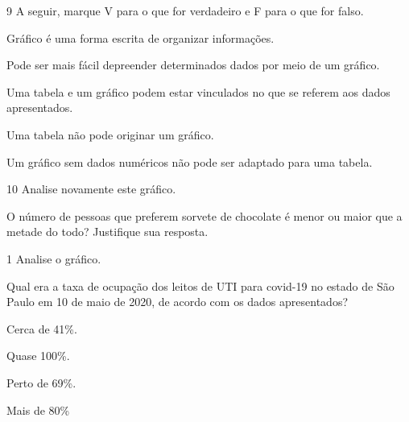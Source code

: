 

\num{9} A seguir, marque V para o que for verdadeiro e F para o que for falso.

\begin{boxlist}
 Gráfico é uma forma escrita de organizar informações.

 Pode ser mais fácil depreender determinados dados por meio de um gráfico.

 Uma tabela e um gráfico podem estar vinculados no que se referem aos dados apresentados.

 Uma tabela não pode originar um gráfico.

 Um gráfico sem dados numéricos não pode ser adaptado para uma tabela.
\end{boxlist}

\num{10} Analise novamente este gráfico.


O número de pessoas que preferem sorvete de chocolate é menor ou maior que a metade do todo? Justifique sua resposta.



\num{1} Analise o gráfico.


Qual era a taxa de ocupação dos leitos de UTI para covid-19 no estado de São
Paulo em 10 de maio de 2020, de acordo com os dados apresentados?

\begin{escolha}
\item Cerca de 41\%.

\item Quase 100\%.

\item Perto de 69\%.

\item Mais de 80\%
\end{escolha}

